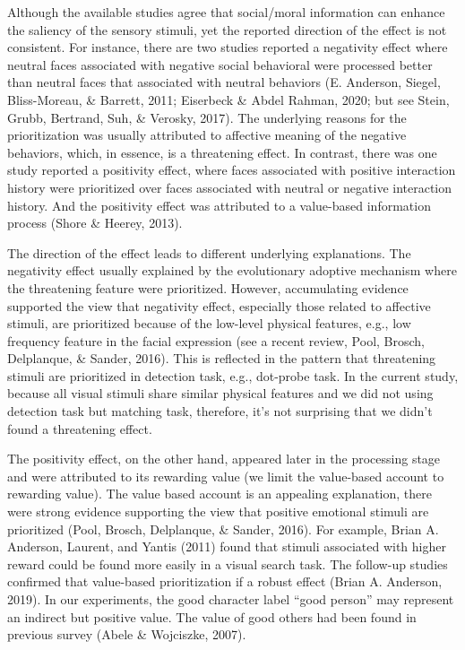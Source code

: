 \documentclass[
  english,
  man]{apa6}
\begin{document}
Although the available studies agree that social/moral information can enhance the saliency of the sensory stimuli, yet the reported direction of the effect is not consistent. For instance, there are two studies reported a negativity effect where neutral faces associated with negative social behavioral were processed better than neutral faces that associated with neutral behaviors (E. Anderson, Siegel, Bliss-Moreau, \& Barrett, 2011; Eiserbeck \& Abdel Rahman, 2020; but see Stein, Grubb, Bertrand, Suh, \& Verosky, 2017). The underlying reasons for the prioritization was usually attributed to affective meaning of the negative behaviors, which, in essence, is a threatening effect. In contrast, there was one study reported a positivity effect, where faces associated with positive interaction history were prioritized over faces associated with neutral or negative interaction history. And the positivity effect was attributed to a value-based information process (Shore \& Heerey, 2013).

The direction of the effect leads to different underlying explanations. The negativity effect usually explained by the evolutionary adoptive mechanism where the threatening feature were prioritized. However, accumulating evidence supported the view that negativity effect, especially those related to affective stimuli, are prioritized because of the low-level physical features, e.g., low frequency feature in the facial expression (see a recent review, Pool, Brosch, Delplanque, \& Sander, 2016). This is reflected in the pattern that threatening stimuli are prioritized in detection task, e.g., dot-probe task. In the current study, because all visual stimuli share similar physical features and we did not using detection task but matching task, therefore, it's not surprising that we didn't found a threatening effect.

The positivity effect, on the other hand, appeared later in the processing stage and were attributed to its rewarding value (we limit the value-based account to rewarding value). The value based account is an appealing explanation, there were strong evidence supporting the view that positive emotional stimuli are prioritized (Pool, Brosch, Delplanque, \& Sander, 2016). For example, Brian A. Anderson, Laurent, and Yantis (2011) found that stimuli associated with higher reward could be found more easily in a visual search task. The follow-up studies confirmed that value-based prioritization if a robust effect (Brian A. Anderson, 2019). In our experiments, the good character label ``good person'' may represent an indirect but positive value. The value of good others had been found in previous survey (Abele \& Wojciszke, 2007).
\end{document}
